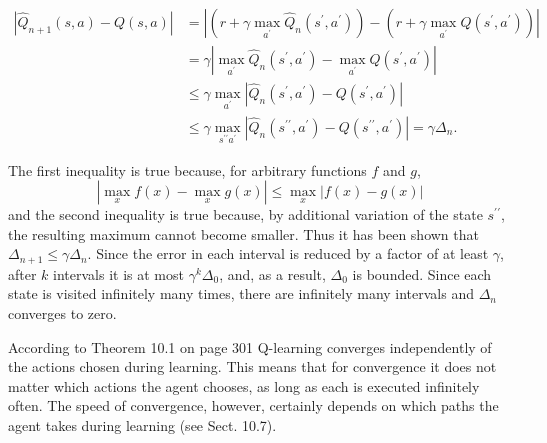 \documentclass[10pt]{book}
\begin{document}
$$
\begin{aligned}
\left|\hat{Q}_{n+1}(s, a)-Q(s, a)\right| & =\left|\left(r+\gamma \max _{a^{\prime}} \hat{Q}_{n}\left(s^{\prime}, a^{\prime}\right)\right)-\left(r+\gamma \max _{a^{\prime}} Q\left(s^{\prime}, a^{\prime}\right)\right)\right| \\
& =\gamma\left|\max _{a^{\prime}} \hat{Q}_{n}\left(s^{\prime}, a^{\prime}\right)-\max _{a^{\prime}} Q\left(s^{\prime}, a^{\prime}\right)\right| \\
& \leq \gamma \max _{a^{\prime}}\left|\hat{Q}_{n}\left(s^{\prime}, a^{\prime}\right)-Q\left(s^{\prime}, a^{\prime}\right)\right| \\
& \leq \gamma \max _{s^{\prime \prime} a^{\prime}}\left|\hat{Q}_{n}\left(s^{\prime \prime}, a^{\prime}\right)-Q\left(s^{\prime \prime}, a^{\prime}\right)\right|=\gamma \Delta_{n} .
\end{aligned}
$$

The first inequality is true because, for arbitrary functions $f$ and $g$,
$$
\left|\max _{x} f(x)-\max _{x} g(x)\right| \leq \max _{x}|f(x)-g(x)|
$$
and the second inequality is true because, by additional variation of the state $s^{\prime \prime}$, the resulting maximum cannot become smaller. Thus it has been shown that $\Delta_{n+1} \leq \gamma \Delta_{n}$. Since the error in each interval is reduced by a factor of at least $\gamma$, after $k$ intervals it is at most $\gamma^{k} \Delta_{0}$, and, as a result, $\Delta_{0}$ is bounded. Since each state is visited infinitely many times, there are infinitely many intervals and $\Delta_{n}$ converges to zero.

According to Theorem 10.1 on page 301 Q-learning converges independently of the actions chosen during learning. This means that for convergence it does not matter which actions the agent chooses, as long as each is executed infinitely often. The speed of convergence, however, certainly depends on which paths the agent takes during learning (see Sect. 10.7).
\end{document}
